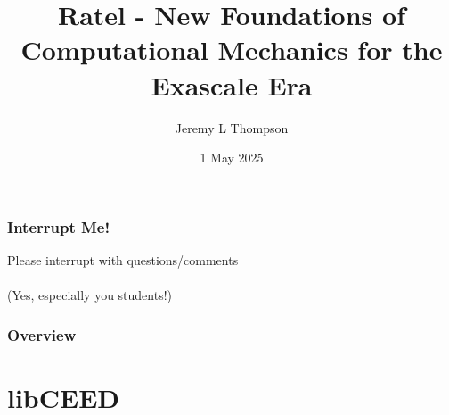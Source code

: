 \documentclass{beamer}
\title[Ratel]{Ratel -  New Foundations of Computational Mechanics for the Exascale Era
} %
\author{Jeremy L Thompson} %
\institute[CU Boulder] %
{University of Colorado Boulder \\ %
\medskip
\textit{jeremy@jeremylt.org} %
}
\date{1 May 2025} %
\begin{document}
\begin{frame}
\titlepage %
\end{frame}


\begin{frame}
\begin{center}
\frametitle{Interrupt Me!}

Please interrupt with questions/comments\\

~\\

(Yes, especially you students!)\\

\end{center}
\end{frame}


\begin{frame}
\frametitle{Overview} %
\tableofcontents %
\end{frame}

\section{libCEED}
\end{document}
